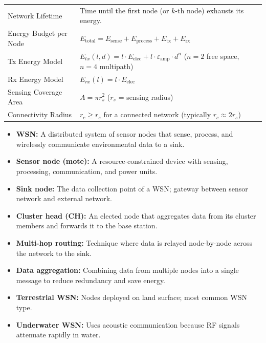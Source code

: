 \documentclass[12pt,a4paper]{article}
\renewcommand{\arraystretch}{1.45}
\begin{document}
\begin{tcolorbox}[formulabox, title={\textbf{Key Formulas and Metrics at a Glance}}]
\renewcommand{\arraystretch}{1.35}
\begin{tabularx}{\linewidth}{B{5.0cm} X}
Network Lifetime & Time until the first node (or $k$-th node) exhausts its energy. \\[4pt]
Energy Budget per Node & $E_{\text{total}} = E_{\text{sense}} + E_{\text{process}} + E_{\text{tx}} + E_{\text{rx}}$ \\[4pt]
Tx Energy Model & $E_{tx}(l, d) = l \cdot E_{\text{elec}} + l \cdot \varepsilon_{\text{amp}} \cdot d^n$ \quad ($n=2$ free space, $n=4$ multipath) \\[4pt]
Rx Energy Model & $E_{rx}(l) = l \cdot E_{\text{elec}}$ \\[4pt]
Sensing Coverage Area & $A = \pi r_s^2$ \quad ($r_s$ = sensing radius) \\[4pt]
Connectivity Radius & $r_c \geq r_s$ for a connected network (typically $r_c \approx 2r_s$)
\end{tabularx}
\end{tcolorbox}

\begin{tcolorbox}[defbox, title={\textbf{One-Line Definitions}}]
\begin{itemize}[leftmargin=*, itemsep=3pt]
  \item \textbf{WSN:} A distributed system of sensor nodes that sense, process, and wirelessly communicate environmental data to a sink.
  \item \textbf{Sensor node (mote):} A resource-constrained device with sensing, processing, communication, and power units.
  \item \textbf{Sink node:} The data collection point of a WSN; gateway between sensor network and external network.
  \item \textbf{Cluster head (CH):} An elected node that aggregates data from its cluster members and forwards it to the base station.
  \item \textbf{Multi-hop routing:} Technique where data is relayed node-by-node across the network to the sink.
  \item \textbf{Data aggregation:} Combining data from multiple nodes into a single message to reduce redundancy and save energy.
  \item \textbf{Terrestrial WSN:} Nodes deployed on land surface; most common WSN type.
  \item \textbf{Underwater WSN:} Uses acoustic communication because RF signals attenuate rapidly in water.
\end{itemize}
\end{tcolorbox}
\end{document}
